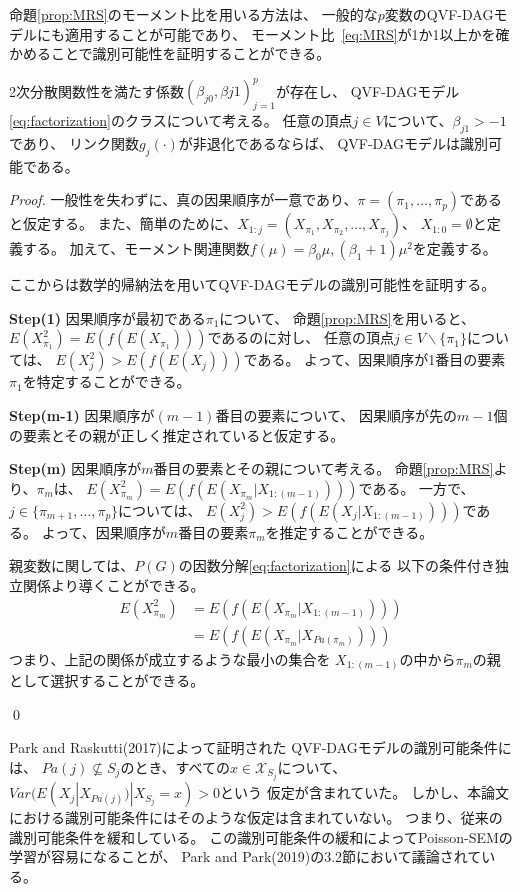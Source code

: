 命題\ref{prop:MRS}のモーメント比を用いる方法は、
一般的な$p$変数のQVF-DAGモデルにも適用することが可能であり、
モーメント比~\eqref{eq:MRS}が1か1以上かを確かめることで識別可能性を証明することができる。

\begin{theo}
  2次分散関数性を満たす係数$(\beta_{j0}, \beta{j1})_{j=1}^p$が存在し、
  QVF-DAGモデル\eqref{eq:factorization}のクラスについて考える。
  任意の頂点$j \in V$について、$\beta_{j1} > -1$であり、
  リンク関数$g_j(\cdot)$が非退化であるならば、
  QVF-DAGモデルは識別可能である。
\end{theo}

\begin{proof}
  一般性を失わずに、真の因果順序が一意であり、$\pi = (\pi_1, \dots, \pi_p)$であると仮定する。
  また、簡単のために、$X_{1:j} = (X_{\pi_1}, X_{\pi_2}, \dots, X_{\pi_j})$、
  $X_{1:0} = \emptyset$と定義する。
  加えて、モーメント関連関数$f(\mu) = \beta_0 \mu, (\beta_1 + 1)\mu^2$を定義する。

  ここからは数学的帰納法を用いてQVF-DAGモデルの識別可能性を証明する。

  \textbf{Step(1)}
  因果順序が最初である$\pi_1$について、
  命題\ref{prop:MRS}を用いると、
  $E(X_{\pi_1}^2) = E(f(E(X_{\pi_1})))$であるのに対し、
  任意の頂点$j \in V \backslash \{ \pi_1 \}$については、
  $E(X_j ^2) > E(f(E(X_j)))$である。
  よって、因果順序が1番目の要素$\pi_1$を特定することができる。

  \textbf{Step(m-1)}
  因果順序が$(m-1)$番目の要素について、
  因果順序が先の$m-1$個の要素とその親が正しく推定されていると仮定する。

  \textbf{Step(m)}
  因果順序が$m$番目の要素とその親について考える。
  命題\ref{prop:MRS}より、$\pi_m$は、
  $E(X_{\pi_m}^2) = E(f(E(X_{\pi_m} | X_{1:(m-1)})))$である。
  一方で、$j \in \{ \pi_{m+1}, \dots, \pi_p \}$については、
  $E(X_j^2) > E(f(E(X_j | X_{1:(m-1)})))$である。
  よって、因果順序が$m$番目の要素$\pi_m$を推定することができる。

  親変数に関しては、$P(G)$の因数分解\eqref{eq:factorization}による
  以下の条件付き独立関係より導くことができる。
  \begin{align*}
    E(X_{\pi_m}^2) &= E(f(E(X_{\pi_m} | X_{1:(m-1)}))) \\
                   &= E(f(E(X_{\pi_m} | X_{Pa(\pi_m)})))
  \end{align*}
  つまり、上記の関係が成立するような最小の集合を
  $X_{1:(m-1)}$の中から$\pi_m$の親として選択することができる。

\qed
\end{proof}

Park and Raskutti(2017)\cite{Park2017-hw}によって証明された
QVF-DAGモデルの識別可能条件には、
$Pa(j) \nsubseteq S_j$のとき、すべての$x \in \mathcal X_{S_j}$について、
$\mathit{Var}(E(X_j | X_{Pa(j)}) | X_{S_j} = x) > 0$という
仮定が含まれていた。
しかし、本論文における識別可能条件にはそのような仮定は含まれていない。
つまり、従来の識別可能条件\cite{Park2017-hw}を緩和している。
この識別可能条件の緩和によってPoisson-SEMの学習が容易になることが、
Park and Park(2019)\cite{Park2019-qy}の3.2節において議論されている。
